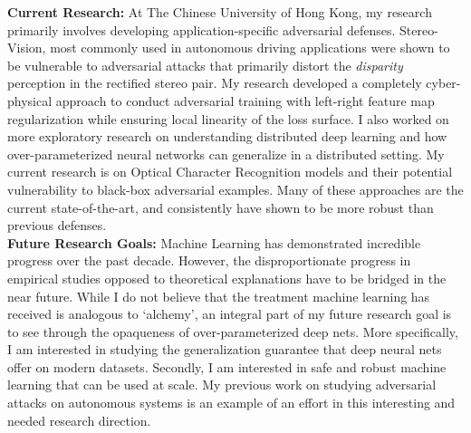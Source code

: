 \documentclass[12pt]{article}
\begin{document}
\textbf{Current Research:} At The Chinese University of Hong Kong, my research primarily involves developing application-specific adversarial defenses. Stereo-Vision, most commonly used in autonomous driving applications were shown to be vulnerable to adversarial attacks that primarily distort the \emph{disparity} perception in the rectified stereo pair. My research developed a completely cyber-physical approach to conduct adversarial training with left-right feature map regularization while ensuring local linearity of the loss surface. I also worked on more exploratory research on understanding distributed deep learning and how over-parameterized neural networks can generalize in a distributed setting. My current research is on Optical Character Recognition models and their potential vulnerability to black-box adversarial examples. Many of these approaches are the current state-of-the-art, and consistently have shown to be more robust than previous defenses.  \\

\textbf{Future Research Goals:} Machine Learning has demonstrated incredible progress over the past decade. However, the disproportionate progress in empirical studies opposed to theoretical explanations have to be bridged in the near future. While I do not believe that the treatment machine learning has received is analogous to `alchemy', an integral part of my future research goal is to see through the opaqueness of over-parameterized deep nets. More specifically, I am interested in studying the generalization guarantee that deep neural nets offer on modern datasets. Secondly, I am interested in safe and robust machine learning that can be used at scale. My previous work on studying adversarial attacks on autonomous systems is an example of an effort in this interesting and needed research direction. 


\end{document}
